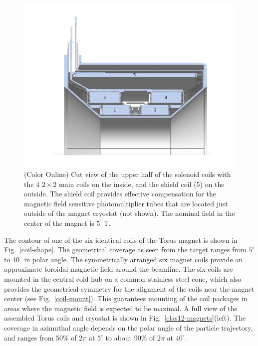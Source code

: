 \documentclass[final,3p,twocolumn]{elsarticle}
\begin{document}
\begin{figure}[htbp!]
\centerline{\includegraphics[width=1.3\columnwidth]{Solenoid.pdf}}
\caption{(Color Online) Cut view of the upper half of the solenoid coils with the 4 $2 \times 2$ main coils on the inside, and the shield
coil (5) on the outside. The shield coil provides effective compensation for the magnetic field sensitive photomultiplier 
tubes that are located just outside of the magnet cryostat (not shown). The nominal field in the center of the magnet is 5~T.}
\label{solenoid-coils}
\end{figure}
The contour of one of the six identical coils of the Torus magnet is shown in Fig.~\ref{coil-shape}. The geometrical
coverage as seen from the target ranges from $5^\circ$ to $40^\circ$ in polar angle. The symmetrically arranged six
magnet coils provide an approximate toroidal magnetic field around the beamline. The six coils are mounted in the
central cold hub on a common stainless steel cone, which also provides the geometrical symmetry for the alignment of
the coils near the magnet center (see Fig.~\ref{coil-mount}). This guarantees mounting of the coil packages in areas
where the magnetic field is expected to be maximal. A full view of the assembled Torus coils and cryostat is shown in
Fig.~\ref{clas12-magnets}(left). The coverage in azimuthal angle depends on the polar angle of the particle trajectory,
and ranges from 50\% of $2\pi$ at $5^\circ$ to about 90\% of $2\pi$ at $40^\circ$.
\end{document}
